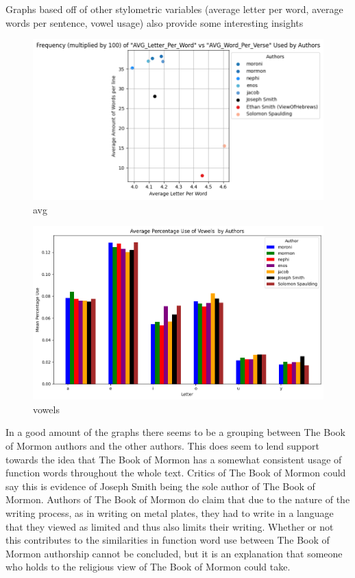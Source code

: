 \documentclass[
  letterpaper,
  DIV=11,
  numbers=noendperiod]{scrartcl}
\begin{document}
Graphs based off of other stylometric variables (average letter per
word, average words per sentence, vowel usage) also provide some
interesting insights

\begin{figure}

{\centering \includegraphics{Graphs/Word Comparisons/avg_output.png}

}

\caption{avg}

\end{figure}

\begin{figure}

{\centering \includegraphics{Graphs/Word Comparisons/vowel_output.png}

}

\caption{vowels}

\end{figure}

In a good amount of the graphs there seems to be a grouping between The
Book of Mormon authors and the other authors. This does seem to lend
support towards the idea that The Book of Mormon has a somewhat
consistent usage of function words throughout the whole text. Critics of
The Book of Mormon could say this is evidence of Joseph Smith being the
sole author of The Book of Mormon. Authors of The Book of Mormon do
claim that due to the nature of the writing process, as in writing on
metal plates, they had to write in a language that they viewed as
limited and thus also limits their writing. Whether or not this
contributes to the similarities in function word use between The Book of
Mormon authorship cannot be concluded, but it is an explanation that
someone who holds to the religious view of The Book of Mormon could
take.
\end{document}
